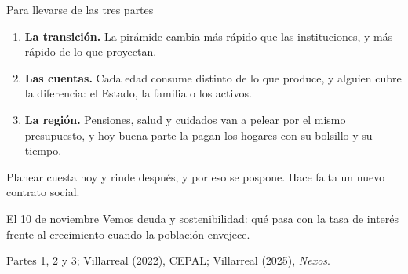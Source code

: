\documentclass[aspectratio=169,11pt]{beamer}
\newcommand{\fuente}[1]{\par\vfill{\small\color{cGris}#1\par}}
\begin{document}
\begin{frame}{Para llevarse de las tres partes}
  \begin{enumerate}
    \item \textbf{La transición.} La pirámide cambia más rápido que las instituciones, y más rápido de lo que proyectan.
    \pause
    \item \textbf{Las cuentas.} Cada edad consume distinto de lo que produce, y alguien cubre la diferencia: el Estado, la familia o los activos.
    \pause
    \item \textbf{La región.} Pensiones, salud y cuidados van a pelear por el mismo presupuesto, y hoy buena parte la pagan los hogares con su bolsillo y su tiempo.
  \end{enumerate}
  \pause
  Planear cuesta hoy y rinde después, y por eso se pospone. Hace falta un nuevo contrato social.
  \begin{block}{El 10 de noviembre}
    Vemos deuda y sostenibilidad: qué pasa con la tasa de interés frente al crecimiento cuando la población envejece.
  \end{block}
  \fuente{Partes 1, 2 y 3; Villarreal (2022), CEPAL; Villarreal (2025), \emph{Nexos}.}
\end{frame}
\end{document}

